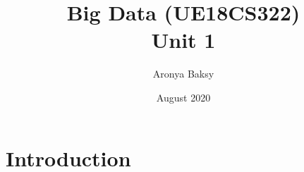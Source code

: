 \documentclass{article}
\title{Big Data (UE18CS322)\\
\large Unit 1}
\author{Aronya Baksy}
\date{August 2020}
\theoremstyle{plain}
\theoremstyle{definition}
\begin{document}
\maketitle

\section{Introduction}
\end{document}
